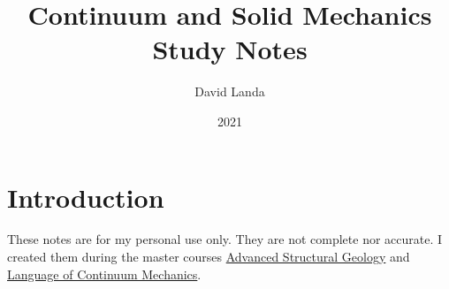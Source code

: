 \documentclass{report}
\title  {Continuum and Solid Mechanics \\ Study Notes}
\author {David Landa}
\date   {2021}
\begin{document}
\maketitle
\tableofcontents

\chapter{Introduction}

These notes are for my personal use only. They are not complete nor accurate. I created them during the master courses  \href{https://is.cuni.cz/studium/eng/predmety/index.php?do=predmet&kod=MG440P46}{Advanced Structural Geology} and \href{https://is.cuni.cz/studium/predmety/index.php?id=15376e056557fd1aa0462c0718f16ca7&tid=&do=predmet&kod=MG451P11&skr=2020}{Language of Continuum Mechanics}. 

% 
% 
% 

\end{document}
